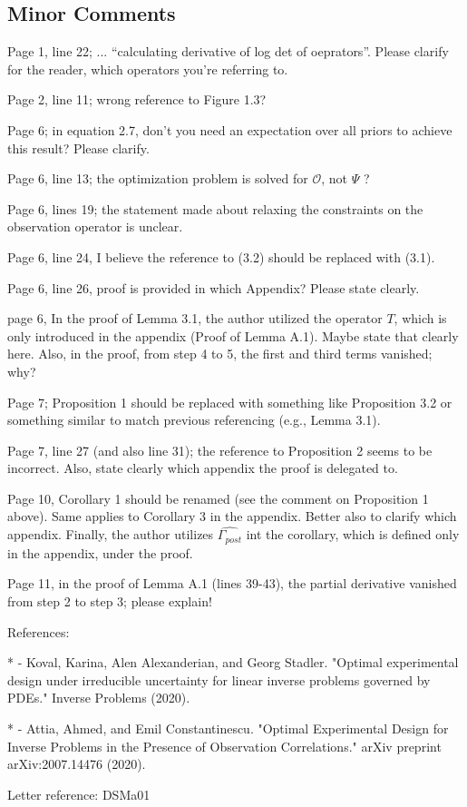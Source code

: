 \documentclass{amsart}
\begin{document}
\subsection{Minor Comments}

Page 1, line 22; ... ``calculating derivative of log det of
oeprators''. Please clarify for the reader, which operators you're
referring to.

Page 2, line 11; wrong reference to Figure 1.3?

Page 6; in equation 2.7, don't you need an expectation over all priors
to achieve this result? Please clarify.

Page 6, line 13; the optimization problem is solved for $\mathcal{O}$,
not $\Psi$ ?

Page 6, lines 19; the statement made about relaxing the constraints on
the observation operator is unclear.

Page 6, line 24, I believe the reference to (3.2) should be replaced
with (3.1).

Page 6, line 26, proof is provided in which Appendix? Please state
clearly.

page 6, In the proof of Lemma 3.1, the author utilized the operator
$T$, which is only introduced in the appendix (Proof of Lemma
A.1). Maybe state that clearly here. Also, in the proof, from step 4
to 5, the first and third terms vanished; why?

Page 7; Proposition 1 should be replaced with something like
Proposition 3.2 or something similar to match previous referencing
(e.g., Lemma 3.1).

Page 7, line 27 (and also line 31); the reference to Proposition 2
seems to be incorrect. Also, state clearly which appendix the proof is
delegated to.

Page 10, Corollary 1 should be renamed (see the comment on Proposition
1 above). Same applies to Corollary 3 in the appendix. Better also to
clarify which appendix. Finally, the author utilizes
$\widehat{\Gamma_{post}}$ int the corollary, which is defined only in
the appendix, under the proof.


Page 11, in the proof of Lemma A.1 (lines 39-43), the partial
derivative vanished from step 2 to step 3; please explain!


References:

* - Koval, Karina, Alen Alexanderian, and Georg
Stadler. "Optimal experimental design under irreducible uncertainty
for linear inverse problems governed by PDEs." Inverse Problems
(2020).

* - Attia, Ahmed, and Emil Constantinescu. "Optimal Experimental
Design for Inverse Problems in the Presence of Observation
Correlations." arXiv preprint arXiv:2007.14476 (2020).

Letter reference: DSMa01
\end{document}
